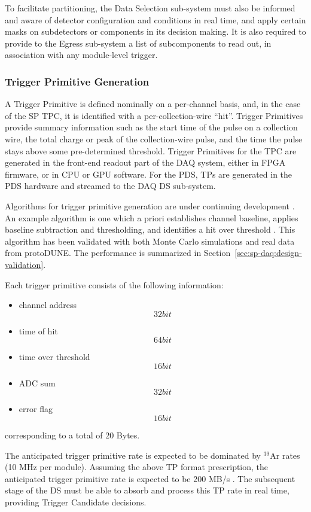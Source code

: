 To facilitate partitioning, the Data Selection sub-system must also be
informed and aware of detector configuration and conditions in real
time, and apply certain masks on subdetectors or components
in its decision making. It is also required to provide to the Egress sub-system a list of
subcomponents to read out, in association
with any module-level trigger.

\subsubsection{Trigger Primitive Generation}
\label{sec:sp-daq:design-trigger-primitives}

A Trigger Primitive is defined nominally on a per-channel basis, and,
in the case of the SP TPC, it is identified with a per-collection-wire
``hit''. Trigger Primitives provide summary information
such as the start time of the pulse on a collection wire, the total
charge or peak of the collection-wire pulse, and the time the pulse
stays above some pre-determined threshold. Trigger Primitives for the
TPC are generated in the front-end readout part of the DAQ 
system, either in FPGA firmware, or in CPU or GPU software. For the
PDS, TPs are generated in the PDS hardware and streamed to the DAQ
DS sub-system.

Algorithms for trigger primitive generation are under continuing development
\cite{docid-11275}. An example algorithm is one which a priori establishes
channel baseline, applies baseline subtraction and thresholding, and
identifies a hit over threshold \cite{docid-11236}. This algorithm has been
validated with both Monte Carlo simulations and real data from protoDUNE. The performance is
summarized in Section~\ref{sec:sp-daq:design-validation}.

Each trigger primitive consists of the following information:
\begin{itemize}
\item channel address \[32 bit\]
\item time of hit \[64 bit\]
\item time over threshold \[16 bit\]
\item ADC sum \[32 bit\]
\item error flag \[16 bit\]
\end{itemize}
corresponding to a total of 20 Bytes.

The anticipated trigger primitive rate  is expected to be dominated by
$^{39}$Ar rates (10 MHz per module). Assuming the above TP format
prescription, the anticipated trigger primitive rate is expected to be
200 MB/s . The subsequent stage of the DS must be able to absorb and
process this TP rate in real time, providing Trigger Candidate decisions. 

